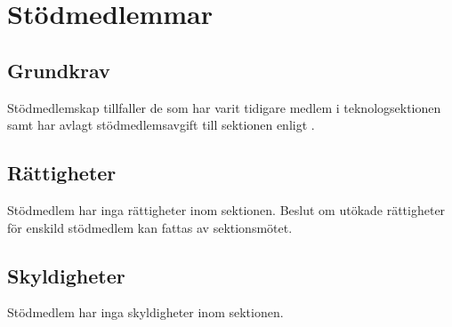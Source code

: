 \section{Stödmedlemmar}

\subsection{Grundkrav}
Stödmedlemskap tillfaller de som har varit tidigare medlem i teknologsektionen samt har avlagt stödmedlemsavgift till sektionen enligt .

\subsection{Rättigheter}
Stödmedlem har inga rättigheter inom sektionen. Beslut om utökade rättigheter för enskild stödmedlem kan fattas av sektionsmötet.

\subsection{Skyldigheter}
Stödmedlem har inga skyldigheter inom sektionen.
